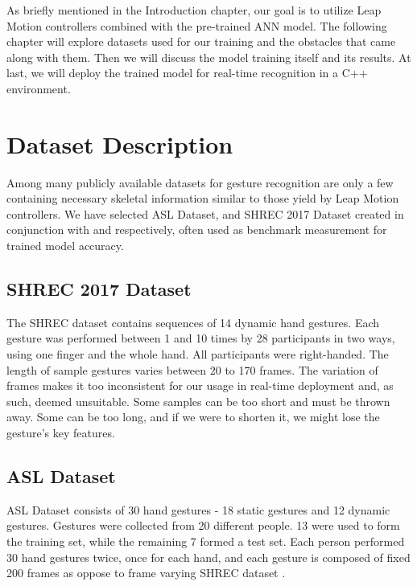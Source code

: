 
As briefly mentioned in the Introduction chapter, our goal is to utilize Leap Motion controllers combined with the pre-trained ANN model. The following chapter will explore datasets used for our training and the obstacles that came along with them. Then we will discuss the model training itself and its results. At last, we will deploy the trained model for real-time recognition in a C++ environment.


\section{Dataset Description}

Among many publicly available datasets for gesture recognition are only a few containing necessary skeletal information similar to those yield by Leap Motion controllers. We have selected ASL Dataset, and SHREC 2017 Dataset created in conjunction with \cite{avola} and \cite{shrec} respectively, often used as benchmark measurement for trained model accuracy.

\subsection{SHREC 2017 Dataset}

The SHREC dataset contains sequences of 14 dynamic hand gestures. Each gesture was performed between 1 and 10 times by 28 participants in two ways, using one finger and the whole hand. All participants were right-handed. The length of sample gestures varies between 20 to 170 frames. The variation of frames makes it too inconsistent for our usage in real-time deployment and, as such, deemed unsuitable. Some samples can be too short and must be thrown away. Some can be too long, and if we were to shorten it, we might lose the gesture's key features.

\subsection{ASL Dataset}

ASL Dataset consists of 30 hand gestures - 18 static gestures and 12 dynamic gestures. Gestures were collected from 20 different people. 13 were used to form the training set, while the remaining 7 formed a test set. Each person performed 30 hand gestures twice, once for each hand, and each gesture is composed of fixed 200 frames as oppose to frame varying SHREC dataset \cite{avola}. 

